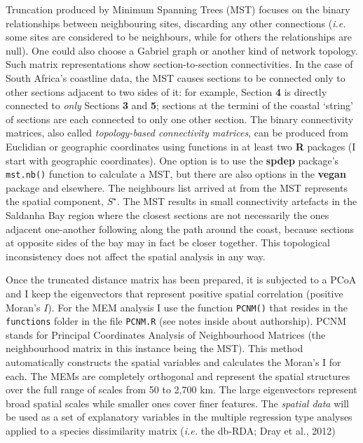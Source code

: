 \documentclass[10pt,A4,]{article}
\begin{document}
Truncation produced by Minimum Spanning Trees (MST) focuses on the
binary relationships between neighbouring sites, discarding any other
connections (\emph{i.e.} some sites are considered to be neighbours,
while for others the relationships are null). One could also choose a
Gabriel graph or another kind of network topology. Such matrix
representations show section-to-section connectivities. In the case of
South Africa's coastline data, the MST causes sections to be connected
only to other sections adjacent to two sides of it: for example, Section
\textbf{4} is directly connected to \emph{only} Sections \textbf{3} and
\textbf{5}; sections at the termini of the coastal `string' of sections
are each connected to only one other section. The binary connectivity
matrices, also called \emph{topology-based connectivity matrices}, can
be produced from Euclidian or geographic coordinates using functions in
at least two \textbf{R} packages (I start with geographic coordinates).
One option is to use the \textbf{spdep} package's \texttt{mst.nb()}
function to calculate a MST, but there are also options in the
\textbf{vegan} package and elsewhere. The neighbours list arrived at
from the MST represents the spatial component, \(S^{\star}\). The MST
results in small connectivity artefacts in the Saldanha Bay region where
the closest sections are not necessarily the ones adjacent one-another
following along the path around the coast, because sections at opposite
sides of the bay may in fact be closer together. This topological
inconsistency does not affect the spatial analysis in any way.

Once the truncated distance matrix has been prepared, it is subjected to
a PCoA and I keep the eigenvectors that represent positive spatial
correlation (positive Moran's \(I\)). For the MEM analysis I use the
function \texttt{PCNM()} that resides in the \texttt{functions} folder
in the file \texttt{PCNM.R} (see notes inside about authorship). PCNM
stands for Principal Coordinates Analysis of Neighbourhood Matrices (the
neighbourhood matrix in this instance being the MST). This method
automatically constructs the spatial variables and calculates the
Moran's I for each. The MEMs are completely orthogonal and represent the
spatial structures over the full range of scales from 50 to 2,700 km.
The large eigenvectors represent broad spatial scales while smaller ones
cover finer features. The \emph{spatial data} will be used as a set of
explanatory variables in the multiple regression type analyses applied
to a species dissimilarity matrix (\emph{i.e.} the db-RDA; Dray et al.,
2012)
\end{document}
